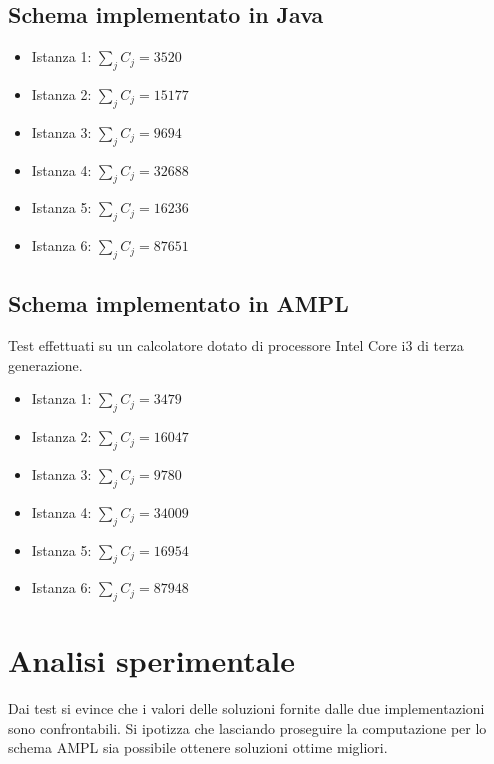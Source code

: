 \documentclass[a4paper]{article}
\begin{document}
\subsection{Schema implementato in Java}
\begin{itemize}
	\item Istanza 1: $\sum_{j} C_j = 3520$%
	\item Istanza 2: $\sum_{j} C_j = 15177$%
	\item Istanza 3: $\sum_{j} C_j = 9694$%
	\item Istanza 4: $\sum_{j} C_j = 32688$%
	\item Istanza 5: $\sum_{j} C_j = 16236$%
	\item Istanza 6: $\sum_{j} C_j = 87651$%
\end{itemize}
\subsection{Schema implementato in AMPL}
Test effettuati su un calcolatore dotato di processore Intel Core i3 di terza generazione.
\begin{itemize}
	\item Istanza 1: $\sum_{j} C_j = 3479$
	\item Istanza 2: $\sum_{j} C_j = 16047$
	\item Istanza 3: $\sum_{j} C_j = 9780$
	\item Istanza 4: $\sum_{j} C_j = 34009$
	\item Istanza 5: $\sum_{j} C_j = 16954$
	\item Istanza 6: $\sum_{j} C_j = 87948$
\end{itemize}
\section{Analisi sperimentale}
Dai test si evince che i valori delle soluzioni fornite dalle due implementazioni sono confrontabili. Si ipotizza che lasciando proseguire la computazione per lo schema AMPL sia possibile ottenere soluzioni ottime migliori.
\end{document}
